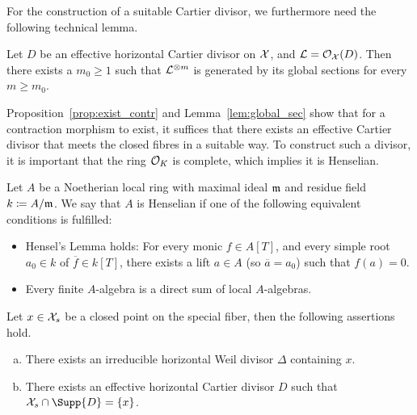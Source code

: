 For the construction of a suitable Cartier divisor, we furthermore need the following technical lemma.

\begin{lemma} \label{lem:global_sec}
    Let $D$ be an effective horizontal Cartier divisor on $\mathcal X$, and $\mathcal{L} = \mathcal{O}_\mathcal X(D)$.
    Then there exists a $m_0 \geq 1$ such that $\mathcal{L}^{\otimes m}$ is generated by its global sections for every $m \geq m_0$.
\end{lemma}

Proposition~\ref{prop:exist_contr} and Lemma~\ref{lem:global_sec} show that for a contraction morphism to exist,
it suffices that there exists an effective Cartier divisor that meets the closed fibres in a suitable way.
To construct such a divisor, it is important that the ring $\mathcal O_K $ is complete, which implies it is Henselian.

\begin{definition} %
    Let $A$ be a Noetherian local ring with maximal ideal $\mathfrak m$ and residue field $k \coloneqq A/\mathfrak m$.
    We say that $A$ is Henselian if one of the following equivalent conditions is fulfilled:
    \begin{itemize}
        \item Hensel's Lemma holds: For every monic $f \in A[T]$, and every simple root $a_0 \in k$ of $\overline{f} \in k[T]$,
            there exists a lift $a \in A$ (so $\overline{a} = a_0$) such that $f(a) = 0$.
        \item Every finite $A$-algebra is a direct sum of local $A$-algebras.
    \end{itemize}
\end{definition}

\begin{lemma} \label{lem:exist_div}
    Let $x \in \mathcal X_s$ be a closed point on the special fiber, then the following assertions hold.
    \begin{enumerate}[(a)]
        \item There exists an irreducible horizontal Weil divisor $\Delta$ containing $x$. \label{lem:exist_div_i}
        \item There exists an effective horizontal Cartier divisor $D$ such that $\X_s \cap \Supp{D} = \{x\}$. \label{lem:exist_div_ii}
    \end{enumerate}
\end{lemma}

